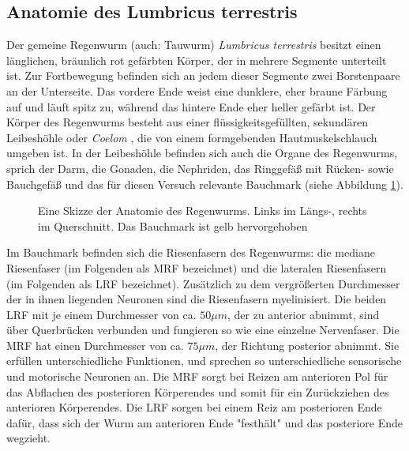 \documentclass[11pt]{article}
\begin{document}
\subsection{Anatomie des Lumbricus terrestris}\label{anatomie} 
Der gemeine Regenwurm (auch: Tauwurm) \textit{Lumbricus terrestris} besitzt einen länglichen, bräunlich rot gefärbten Körper, der in mehrere Segmente unterteilt ist. Zur Fortbewegung befinden sich an jedem dieser Segmente zwei Borstenpaare an der Unterseite. Das vordere Ende weist eine dunklere, eher braune Färbung auf und läuft spitz zu, während das hintere Ende eher heller gefärbt ist. Der Körper des Regenwurms besteht aus einer flüssigkeitsgefüllten, sekundären Leibeshöhle oder \textit{Coelom} , die von einem formgebenden Hautmuskelschlauch umgeben ist. In der Leibeshöhle befinden sich auch die Organe des Regenwurms, sprich der Darm, die Gonaden, die Nephriden, das Ringgefäß mit Rücken- sowie Bauchgefäß und das für diesen Versuch relevante Bauchmark (siehe Abbildung \ref{bauchmark}). 
\begin{figure}[H]
\caption{Eine Skizze der Anatomie des Regenwurms. Links im Längs-, rechts im Querschnitt. Das Bauchmark ist gelb hervorgehoben}
\label{bauchmark}
\end{figure}
Im Bauchmark befinden sich die Riesenfasern des Regenwurms: die mediane Riesenfaser (im Folgenden als MRF bezeichnet) und die lateralen Riesenfasern (im Folgenden als LRF bezeichnet). Zusätzlich zu dem vergrößerten Durchmesser der in ihnen liegenden Neuronen sind die Riesenfasern myelinisiert. Die beiden LRF mit je einem Durchmesser von ca. $50 \mu m$, der zu anterior abnimmt, sind über Querbrücken verbunden und fungieren so wie eine einzelne Nervenfaser. Die MRF hat einen Durchmesser von ca. $75 \mu m$, der Richtung posterior abnimmt. Sie erfüllen unterschiedliche Funktionen, und sprechen so unterschiedliche sensorische und motorische Neuronen an. Die MRF sorgt bei Reizen am anterioren Pol für das Abflachen des posterioren Körperendes und somit für ein Zurückziehen des anterioren Körperendes. Die LRF sorgen bei einem Reiz am posterioren Ende dafür, dass sich der Wurm am anterioren Ende "{}festhält"{} und das posteriore Ende wegzieht.\cite{skript}
\end{document}
